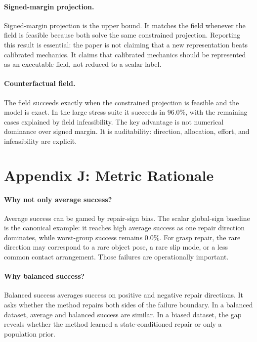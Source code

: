 \documentclass{article}
\begin{document}
\paragraph{Signed-margin projection.}
Signed-margin projection is the upper bound. It matches the field whenever the field is feasible because both solve the same constrained projection. Reporting this result is essential: the paper is not claiming that a new representation beats calibrated mechanics. It claims that calibrated mechanics should be represented as an executable field, not reduced to a scalar label.

\paragraph{Counterfactual field.}
The field succeeds exactly when the constrained projection is feasible and the model is exact. In the large stress suite it succeeds in 96.0\%, with the remaining cases explained by field infeasibility. The key advantage is not numerical dominance over signed margin. It is auditability: direction, allocation, effort, and infeasibility are explicit.

\clearpage
\section{Appendix J: Metric Rationale}

\paragraph{Why not only average success?}
Average success can be gamed by repair-sign bias. The scalar global-sign baseline is the canonical example: it reaches high average success as one repair direction dominates, while worst-group success remains 0.0\%. For grasp repair, the rare direction may correspond to a rare object pose, a rare slip mode, or a less common contact arrangement. Those failures are operationally important.

\paragraph{Why balanced success?}
Balanced success averages success on positive and negative repair directions. It asks whether the method repairs both sides of the failure boundary. In a balanced dataset, average and balanced success are similar. In a biased dataset, the gap reveals whether the method learned a state-conditioned repair or only a population prior.
\end{document}
